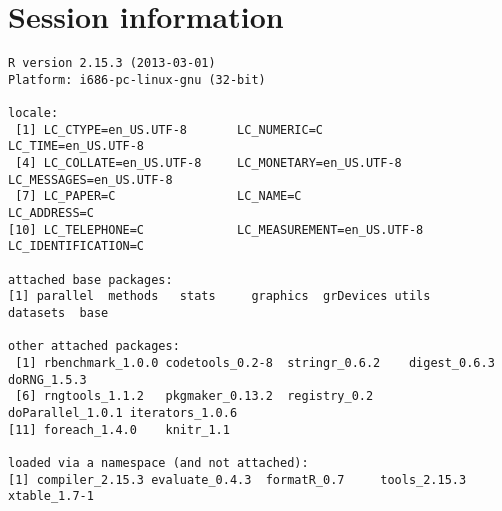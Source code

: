 \documentclass[a4paper,12pt]{article}\usepackage{graphicx, color}
\makeatletter
\newenvironment{kframe}{%
 \def\at@end@of@kframe{}%
 \ifinner\ifhmode%
  \def\at@end@of@kframe{\end{minipage}}%
  \begin{minipage}{\columnwidth}%
 \fi\fi%
 \def\FrameCommand##1{\hskip\@totalleftmargin \hskip-\fboxsep
 \colorbox{shadecolor}{##1}\hskip-\fboxsep
     \hskip-\linewidth \hskip-\@totalleftmargin \hskip\columnwidth}%
 \MakeFramed {\advance\hsize-\width
   \@totalleftmargin\z@ \linewidth\hsize
   \@setminipage}}%
 {\par\unskip\endMakeFramed%
 \at@end@of@kframe}
\newenvironment{knitrout}{}{} %
\renewenvironment{knitrout}{\begin{footnotesize}}{\end{footnotesize}}
\makeatother
\begin{document}
\section*{Session information}
\begin{knitrout}
\color{fgcolor}\begin{kframe}
\begin{verbatim}
R version 2.15.3 (2013-03-01)
Platform: i686-pc-linux-gnu (32-bit)

locale:
 [1] LC_CTYPE=en_US.UTF-8       LC_NUMERIC=C               LC_TIME=en_US.UTF-8       
 [4] LC_COLLATE=en_US.UTF-8     LC_MONETARY=en_US.UTF-8    LC_MESSAGES=en_US.UTF-8   
 [7] LC_PAPER=C                 LC_NAME=C                  LC_ADDRESS=C              
[10] LC_TELEPHONE=C             LC_MEASUREMENT=en_US.UTF-8 LC_IDENTIFICATION=C       

attached base packages:
[1] parallel  methods   stats     graphics  grDevices utils     datasets  base     

other attached packages:
 [1] rbenchmark_1.0.0 codetools_0.2-8  stringr_0.6.2    digest_0.6.3     doRNG_1.5.3     
 [6] rngtools_1.1.2   pkgmaker_0.13.2  registry_0.2     doParallel_1.0.1 iterators_1.0.6 
[11] foreach_1.4.0    knitr_1.1       

loaded via a namespace (and not attached):
[1] compiler_2.15.3 evaluate_0.4.3  formatR_0.7     tools_2.15.3    xtable_1.7-1   
\end{verbatim}
\end{kframe}
\end{knitrout}


\printbibliography[heading=bibintoc]
\end{document}
